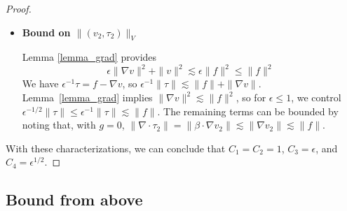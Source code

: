 \documentclass[11pt,onecolumn]{scrartcl}
\newcommand{\grad}{\nabla}
\renewcommand{\div}{\grad \cdot}
\begin{document}
\begin{proof}
\begin{itemize}
\item \textbf{Bound on $\|\left(v_{2},\tau_{2}\right)\|_V$}

Lemma \ref{lemma_grad} provides
\[
\epsilon \|\grad v\|^2 + \|v\|^2 \lesssim  \epsilon \| f\|^2 \leq \|f\|^2
\]
We have $\epsilon^{-1}\tau = f - \grad v$, so $\epsilon^{-1} \|\tau\| \lesssim \|f\| + \|\grad v\|$. Lemma~\ref{lemma_grad} implies $\|\grad v\|^2  \lesssim  \| f\|^2$, so for $\epsilon \leq 1$, we control $\epsilon^{-1/2}\|\tau\| \leq \epsilon^{-1}\|\tau\| \lesssim \|f\|$.  The remaining terms can be bounded by noting that, with $g = 0$, $\|\div \tau_2\| = \|\beta\cdot \grad v_2\| \lesssim \|\grad v_2\| \lesssim \|f\| $.
\end{itemize}

With these characterizations, we can conclude that $C_1 = C_2 = 1$, $C_3 = \epsilon$, and $C_4 = \epsilon^{1/2}$.  
\end{proof}

\subsection{Bound from above}
\end{document}
